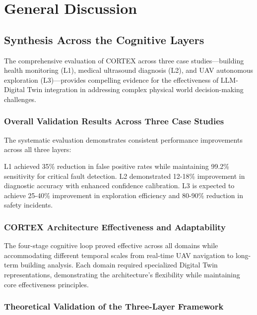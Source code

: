
\chapter{General Discussion} \label{chp:discussion}

\section{Synthesis Across the Cognitive Layers}

The comprehensive evaluation of CORTEX across three case studies—building health monitoring (L1), medical ultrasound diagnosis (L2), and UAV autonomous exploration (L3)—provides compelling evidence for the effectiveness of LLM-Digital Twin integration in addressing complex physical world decision-making challenges.

\subsection{Overall Validation Results Across Three Case Studies}

The systematic evaluation demonstrates consistent performance improvements across all three layers:

L1 achieved 35\% reduction in false positive rates while maintaining 99.2\% sensitivity for critical fault detection. L2 demonstrated 12-18\% improvement in diagnostic accuracy with enhanced confidence calibration. L3 is expected to achieve 25-40\% improvement in exploration efficiency and 80-90\% reduction in safety incidents.

\subsection{CORTEX Architecture Effectiveness and Adaptability}

The four-stage cognitive loop proved effective across all domains while accommodating different temporal scales from real-time UAV navigation to long-term building analysis. Each domain required specialized Digital Twin representations, demonstrating the architecture's flexibility while maintaining core effectiveness principles.

\subsection{Theoretical Validation of the Three-Layer Framework}

